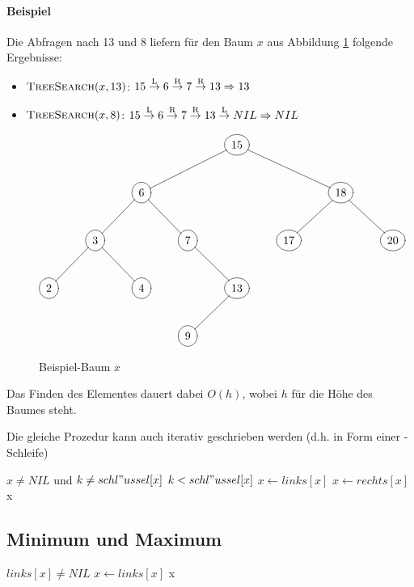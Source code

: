 \documentclass[a4paper,twoside,DIV15,BCOR12mm]{scrbook}
\begin{document}
\paragraph{Beispiel}
Die Abfragen nach 13 und 8 liefern für den Baum $x$ aus Abbildung \ref{tree4} folgende Ergebnisse:
\begin{itemize}
\item $\textnormal{\scshape TreeSearch}(x,13)$: $15 \stackrel{\text{L}}{\rightarrow} 6 \stackrel{\text{R}}{\rightarrow} 7 
			\stackrel{\text{R}}{\rightarrow} 13 \Rightarrow 13$
\item $\textnormal{\scshape TreeSearch}(x,8)$:  $15 \stackrel{\text{L}}{\rightarrow} 6 \stackrel{\text{R}}{\rightarrow} 7 
			\stackrel{\text{R}}{\rightarrow} 13	\stackrel{\text{L}}{\rightarrow} NIL \Rightarrow NIL$
\end{itemize}
\begin{figure}[htb]
	\centering
	$\begin{xy}
		\entrymodifiers={++[o][F-]}
		\xymatrix {
	  	*{} & *{} & *{} & *{} &  15 \ar@{-}[rrd]\ar@{-}[lld]& *{} & *{} & *{} \\
	  	*{} & *{} &   6 \ar@{-}[rd]\ar@{-}[ld]& *{} & *{} & *{} &  18 \ar@{-}[rd]\ar@{-}[ld]& *{} \\
	  	*{} &   3 \ar@{-}[rd]\ar@{-}[ld]& *{} &   7\ar@{-}[rd] & *{} &  17 & *{} &  20 \\
	  	  2 & *{} &   4 & *{} &  13 \ar@{-}[ld] & *{} & *{} & *{} \\
	  	*{} & *{} & *{} &   9 & *{} & *{} & *{} & *{} \\
		}
	\end{xy}$
	\caption{Beispiel-Baum $x$}
	\label{tree4}
\end{figure}
Das Finden des Elementes dauert dabei $O(h)$, wobei $h$ für die Höhe des Baumes steht.

Die gleiche Prozedur kann auch iterativ geschrieben werden (d.h. in Form einer \While-Schleife)
\begin{codebox}
\li \While $x \neq NIL$ und $k \neq schl"ussel[x]$
\li		\Do \If $k < schl"ussel[x]$
\li					\Then $x \gets links[x]$
\li					\Else $x \gets rechts[x]$
					\End
			\End
\li	\Return x
\end{codebox}

\subsection{Minimum und Maximum}
\begin{codebox}
\li \While $links[x] \neq NIL$
\li 	\Do $x \gets links[x]$
		\End
\li	\Return x
\end{codebox}
\end{document}
